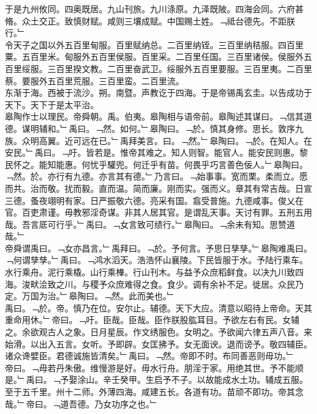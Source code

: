 \documentclass{zhvt-classic}
\begin{document}
\hspace*{2em}于是九州攸同。四奥既居。九山刊旅。九川涤原。九泽既陂。四海会同。六府甚脩。众土交正。致慎财赋。咸则三壤成赋。中国赐土姓。﹁祗台德先。不距朕行。﹂\\
\hspace*{2em}令天子之国以外五百里甸服。百里赋纳总。二百里纳铚。三百里纳秸服。四百里粟。五百里米。甸服外五百里侯服。百里采。二百里任国。三百里诸侯。侯服外五百里绥服。三百里揆文教。二百里奋武卫。绥服外五百里要服。三百里夷。二百里蔡。要服外五百里荒服。三百里蛮。二百里流。\\
\hspace*{2em}东渐于海。西被于流沙。朔。南暨。声教讫于四海。于是帝锡禹玄圭。以告成功于天下。天下于是太平治。\\
\hspace*{2em}皋陶作士以理民。帝舜朝。禹。伯夷。皋陶相与语帝前。皋陶述其谋曰。﹁信其道德。谋明辅和。﹂禹曰。﹁然。如何。﹂皋陶曰。﹁於。慎其身修。思长。敦序九族。众明高翼。近可远在已。﹂禹拜美言。曰。﹁然。﹂皋陶曰。﹁於。在知人。在安民。﹂禹曰。﹁吁。皆若是。惟帝其难之。知人则智。能官人。能安民则惠。黎民怀之。能知能惠。何忧乎驩兜。何迁乎有苗。何畏乎巧言善色佞人。﹂皋陶曰。﹁然。於。亦行有九德。亦言其有德。﹂乃言曰。﹁始事事。宽而栗。柔而立。愿而共。治而敬。扰而毅。直而温。简而廉。刚而实。强而义。章其有常吉哉。日宣三德。蚤夜翊明有家。日严振敬六德。亮采有国。翕受普施。九德咸事。俊乂在官。百吏肃谨。毋教邪淫奇谋。非其人居其官。是谓乱天事。天讨有罪。五刑五用哉。吾言厎可行乎。﹂禹曰。﹁女言致可绩行。﹂皋陶曰。﹁余未有知。思赞道哉。﹂\\
\hspace*{2em}帝舜谓禹曰。﹁女亦昌言。﹂禹拜曰。﹁於。予何言。予思日孳孳。﹂皋陶难禹曰。﹁何谓孳孳。﹂禹曰。﹁鸿水滔天。浩浩怀山襄陵。下民皆服于水。予陆行乘车。水行乘舟。泥行乘橇。山行乘檋。行山刊木。与益予众庶稻鲜食。以决九川致四海。浚畎浍致之川。与稷予众庶难得之食。食少。调有余补不足。徙居。众民乃定。万国为治。﹂皋陶曰。﹁然。此而美也。﹂\\
\hspace*{2em}禹曰。﹁於。帝。慎乃在位。安尔止。辅德。天下大应。清意以昭待上帝命。天其重命用休。﹂帝曰。﹁吁。臣哉。臣哉。臣作朕股肱耳目。予欲左右有民。女辅之。余欲观古人之象。日月星辰。作文绣服色。女明之。予欲闻六律五声八音。来始滑。以出入五言。女听。予即辟。女匡拂予。女无面谀。退而谤予。敬四辅臣。诸众谗嬖臣。君德诚施皆清矣。﹂禹曰。﹁然。帝即不时。布同善恶则毋功。﹂\\
\hspace*{2em}帝曰。﹁毋若丹朱傲。维慢游是好。毋水行舟。朋淫于家。用绝其世。予不能顺是。﹂禹曰。﹁予娶涂山。辛壬癸甲。生启予不子。以故能成水土功。辅成五服。至于五千里。州十二师。外薄四海。咸建五长。各道有功。苗顽不即功。帝其念哉。﹂帝曰。﹁道吾德。乃女功序之也。﹂\\
\end{document}
